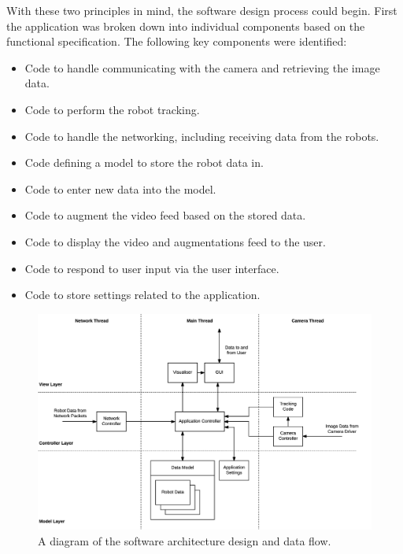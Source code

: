 With these two principles in mind, the software design process could begin. First the application was broken down into individual components based on the functional specification. The following key components were identified:

\begin{itemize}
\item Code to handle communicating with the camera and retrieving the image data.
\item Code to perform the robot tracking.
\item Code to handle the networking, including receiving data from the robots.
\item Code defining a model to store the robot data in.
\item Code to enter new data into the model.
\item Code to augment the video feed based on the stored data.
\item Code to display the video and augmentations feed to the user.
\item Code to respond to user input via the user interface.
\item Code to store settings related to the application.
\end{itemize}

\begin{figure}[h]
	\centering
	\includegraphics[scale=0.7]{Figures/SoftwareArchitecture.png}
	\decoRule
	\caption[Software Architecture Diagram]{A diagram of the software architecture design and data flow.}
	\label{fig:SoftwareArchitecture}
\end{figure}

